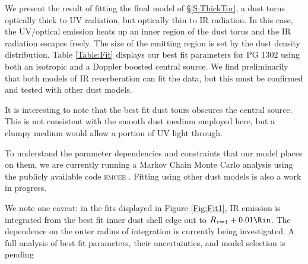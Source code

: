 We present the result of fitting the final model of \S \ref{S:ThickTor}, a dust torus 
optically thick to UV radiation, but optically thin to
IR radiation. In this case, the UV/optical emission heats up an inner region 
of the dust torus and the IR radiation escapes freely. 
The size of the emitting region is set by the dust density distribution. 
Table \ref{Table:Fit} displays our best fit parameters for PG 1302 using both an 
isotropic and a Doppler boosted central source. We find preliminarily that both models 
of IR reverberation can fit the data, but this must be confirmed and tested with other dust models. 

It is interesting to note that the best fit dust tours obscures the central source. This is not consistent with the smooth dust medium employed here, but a clumpy medium would allow a portion of UV light through.




To understand the parameter dependencies and
constraints that our model places on them, we are currently running a Markov
Chain Monte Carlo analysis using the publicly available code \textsc{emcee} \citep{DFM:2013}. Fitting using other dust models is also a work in progress.

We note one caveat: in the fits displayed in Figure \ref{Fig:Fit1}, IR emission is integrated from the best fit inner dust shell edge out to $R_{\tau=1} + 0.01 \Rin$. The dependence on the outer radius of integration is currently being investigated. A full analysis of best fit parameters, their uncertainties, and model selection is pending


